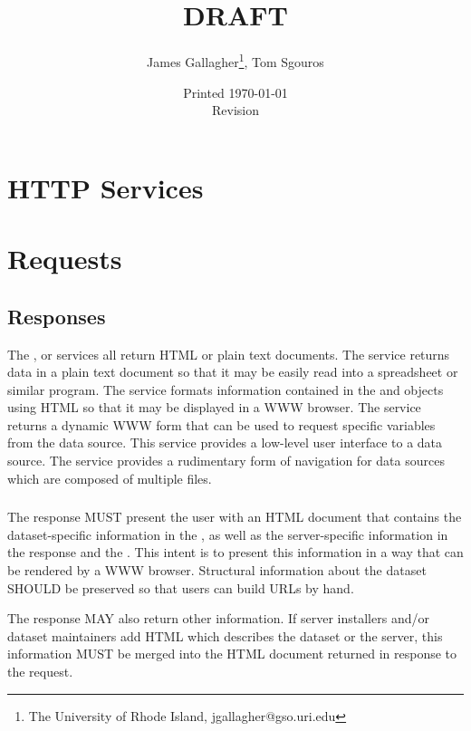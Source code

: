 \documentclass[justify]{dods-paper}
\title{\DAPServicesTitle\\ DRAFT}
\author{James Gallagher\thanks{The University of Rhode Island,
    jgallagher@gso.uri.edu}, Tom Sgouros}
\date{Printed \today \\ Revision \rcsInfoRevision}
\begin{document}


\maketitle
\T\tableofcontents

\section{HTTP Services}


\section{Requests}

\subsection{Responses}
\label{sec-resp-bodies}


The \INFO, \HTML or \DIR services all return HTML or plain
text documents. The \TEXT service returns data in a plain text document so
that it may be easily read into a spreadsheet or similar program. The \INFO
service formats information contained in the \DDS and \DAS objects
using HTML so that it may be displayed in a WWW browser. The \HTML
service returns a dynamic WWW form that can be used to request specific
variables from the data source. This service provides a low-level user
interface to a data source. The \DIR service provides a rudimentary form
of navigation for data sources which are composed of multiple files.

\subsubsection{\INFO}
\label{sec-info}

The \INFO response MUST present the user with an HTML document that
contains the dataset-specific information in the \DAX, as well as the
server-specific information in the \VER response and the \CapX.  This
intent is to present this information in a way that can be rendered by
a WWW browser.  Structural information about the dataset SHOULD be
preserved so that users can build \DAP URLs by hand.

The \INFO response MAY also return other information. If server
installers and/or dataset maintainers add HTML which describes the
dataset or the server, this information MUST be merged into the HTML
document returned in response to the \INFO request.
\end{document}
